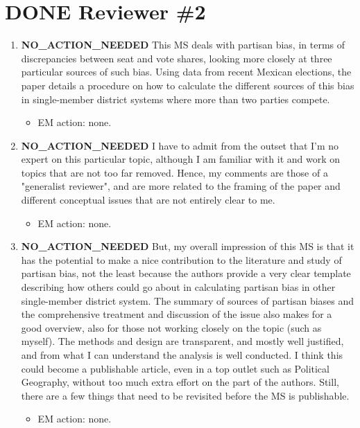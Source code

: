 \documentclass{article}
\begin{document}
\section{{\bfseries\sffamily DONE} Reviewer \#2}
\label{sec:orgheadline16}
\begin{enumerate}
\item {\bfseries\sffamily NO\_ACTION\_NEEDED} This MS deals with partisan bias, in terms of discrepancies between seat and vote shares, looking more closely at three particular sources of such bias. Using data from recent Mexican elections, the paper details a procedure on how to calculate the different sources of this bias in single-member district systems where more than two parties compete.
\label{sec:orgheadline3}
\begin{itemize}
\item EM action: none.
\end{itemize}
\item {\bfseries\sffamily NO\_ACTION\_NEEDED} I have to admit from the outset that I'm no expert on this particular topic, although I am familiar with it and work on topics that are not too far removed. Hence, my comments are those of a "generalist reviewer", and are more related to the framing of the paper and different conceptual issues that are not entirely clear to me.
\label{sec:orgheadline4}
\begin{itemize}
\item EM action: none.
\end{itemize}
\item {\bfseries\sffamily NO\_ACTION\_NEEDED} But, my overall impression of this MS is that it has the potential to make a nice contribution to the literature and study of partisan bias, not the least because the authors provide a very clear template describing how others could go about in calculating partisan bias in other single-member district system. The summary of sources of partisan biases and the comprehensive treatment and discussion of the issue also makes for a good overview, also for those not working closely on the topic (such as myself). The methods and design are transparent, and mostly well justified, and from what I can understand the analysis is well conducted. I think this could become a publishable article, even in a top outlet such as Political Geography, without too much extra effort on the part of the authors. Still, there are a few things that need to be revisited before the MS is publishable.
\label{sec:orgheadline5}
\begin{itemize}
\item EM action: none.

\end{itemize}
\end{enumerate}
\end{document}
